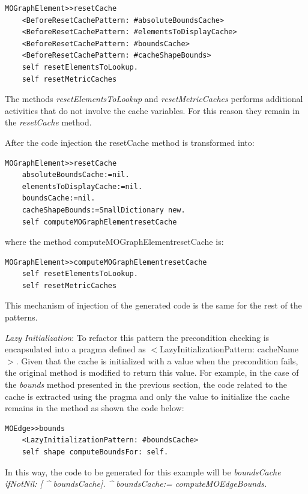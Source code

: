 \documentclass[runningheads]{llncs}
\begin{document}
\begin{lstlisting} 
MOGraphElement>>resetCache 
	<BeforeResetCachePattern: #absoluteBoundsCache> 
	<BeforeResetCachePattern: #elementsToDisplayCache>
	<BeforeResetCachePattern: #boundsCache> 
	<BeforeResetCachePattern: #cacheShapeBounds> 
	self resetElementsToLookup. 
	self resetMetricCaches
\end{lstlisting}

The methods \emph{resetElementsToLookup} and \emph{resetMetricCaches} 
performs additional activities that do not involve the cache variables. For this reason they remain in the \emph{resetCache} method.

After the code injection the resetCache method is transformed into:

\begin{lstlisting} 
MOGraphElement>>resetCache 
	absoluteBoundsCache:=nil.
	elementsToDisplayCache:=nil. 
	boundsCache:=nil. 
	cacheShapeBounds:=SmallDictionary new. 
	self computeMOGraphElementresetCache 
\end{lstlisting}

where the method computeMOGraphElementresetCache is:

\begin{lstlisting} 
MOGraphElement>>computeMOGraphElementresetCache
	self resetElementsToLookup. 
	self resetMetricCaches 
\end{lstlisting}

This mechanism of injection of the generated code is the same for
the rest of the patterns.

\emph{Lazy Initialization}: To refactor this pattern
the precondition checking is encapsulated into a pragma defined as
$<$LazyInitializationPattern: cacheName$>$. Given that
the cache is initialized with a value when the precondition fails,
the original method is modified to return this value. For example,
in the case of the \emph{bounds} method presented in the previous
section, the code related to the cache is extracted using the pragma
and only the value to initialize the cache remains in the method as
shown the code below:

\begin{lstlisting} 
MOEdge>>bounds 
	<LazyInitializationPattern: #boundsCache> 
	self shape computeBoundsFor: self. 
\end{lstlisting}

In this way, the code to be generated for this example will be \emph{boundsCache
ifNotNil: {[} \textasciicircum{} boundsCache{]}. \textasciicircum{}
boundsCache:= computeMOEdgeBounds.}
\end{document}
